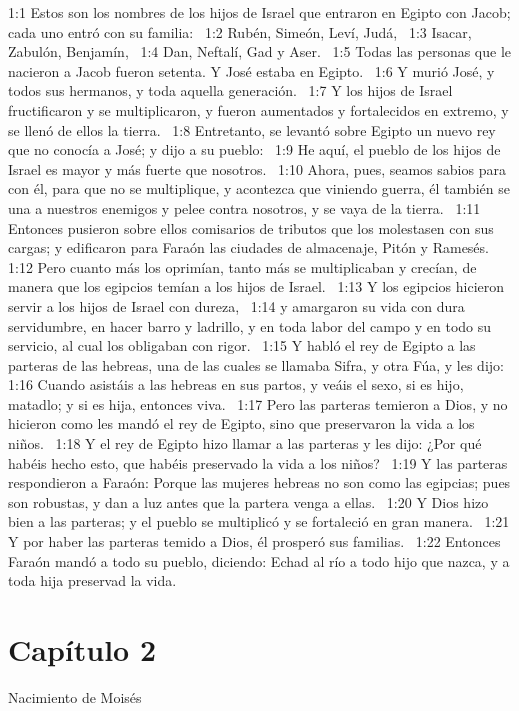 1:1 Estos son los nombres de los hijos de Israel que entraron en Egipto con Jacob; cada uno entró con su familia:  
1:2 Rubén, Simeón, Leví, Judá,  
1:3 Isacar, Zabulón, Benjamín,  
1:4 Dan, Neftalí, Gad y Aser.  
1:5 Todas las personas que le nacieron a Jacob fueron setenta. Y José estaba en Egipto.  
1:6 Y murió José, y todos sus hermanos, y toda aquella generación.  
1:7 Y los hijos de Israel fructificaron y se multiplicaron, y fueron aumentados y fortalecidos en extremo, y se llenó de ellos la tierra.  
1:8 Entretanto, se levantó sobre Egipto un nuevo rey que no conocía a José; y dijo a su pueblo:  
1:9 He aquí, el pueblo de los hijos de Israel es mayor y más fuerte que nosotros.  
1:10 Ahora, pues, seamos sabios para con él, para que no se multiplique, y acontezca que viniendo guerra, él también se una a nuestros enemigos y pelee contra nosotros, y se vaya de la tierra.  
1:11 Entonces pusieron sobre ellos comisarios de tributos que los molestasen con sus cargas; y edificaron para Faraón las ciudades de almacenaje, Pitón y Ramesés.  
1:12 Pero cuanto más los oprimían, tanto más se multiplicaban y crecían, de manera que los egipcios temían a los hijos de Israel.  
1:13 Y los egipcios hicieron servir a los hijos de Israel con dureza,  
1:14 y amargaron su vida con dura servidumbre, en hacer barro y ladrillo, y en toda labor del campo y en todo su servicio, al cual los obligaban con rigor.  
1:15 Y habló el rey de Egipto a las parteras de las hebreas, una de las cuales se llamaba Sifra, y otra Fúa, y les dijo:  
1:16 Cuando asistáis a las hebreas en sus partos, y veáis el sexo, si es hijo, matadlo; y si es hija, entonces viva.  
1:17 Pero las parteras temieron a Dios, y no hicieron como les mandó el rey de Egipto, sino que preservaron la vida a los niños.  
1:18 Y el rey de Egipto hizo llamar a las parteras y les dijo: ¿Por qué habéis hecho esto, que habéis preservado la vida a los niños?  
1:19 Y las parteras respondieron a Faraón: Porque las mujeres hebreas no son como las egipcias; pues son robustas, y dan a luz antes que la partera venga a ellas.  
1:20 Y Dios hizo bien a las parteras; y el pueblo se multiplicó y se fortaleció en gran manera.  
1:21 Y por haber las parteras temido a Dios, él prosperó sus familias.  
1:22 Entonces Faraón mandó a todo su pueblo, diciendo: Echad al río a todo hijo que nazca, y a toda hija preservad la vida.  
\section*{Capítulo 2}
Nacimiento de Moisés  

